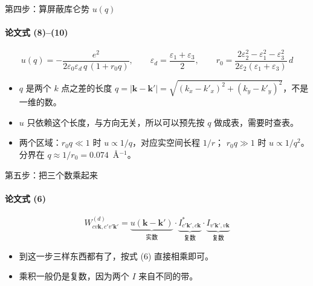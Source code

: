 \documentclass[aspectratio=169,11pt]{ctexbeamer}
\newcommand{\eps}{\varepsilon}
\newcommand{\kk}{\mathbf{k}}
\newcommand{\kq}{\mathbf{k}'}
\begin{document}
\begin{frame}{第四步：算屏蔽库仑势 $u(q)$}
  \framesubtitle{论文式 (8)--(10)}
  \begin{equation*}
    u(q)=-\frac{e^2}{2\eps_0\eps_d\,q\,(1+r_0q)},
    \qquad
    \eps_d=\frac{\eps_1+\eps_3}{2},
    \qquad
    r_0=\frac{2\eps_2^2-\eps_1^2-\eps_3^2}{2\eps_2(\eps_1+\eps_3)}\,d
  \end{equation*}
  \begin{itemize}
    \item $q$ 是两个 $k$ 点之差的长度
          $q=|\kk-\kq|=\sqrt{(k_x-k'_x)^2+(k_y-k'_y)^2}$，不是一维的数。
    \item $u$ 只依赖这个长度，与方向无关，所以可以预先按 $q$ 做成表，需要时查表。
    \item 两个区域：$r_0q\ll1$ 时 $u\propto1/q$，对应实空间长程 $1/r$；
          $r_0q\gg1$ 时 $u\propto1/q^2$。分界在 $q\approx1/r_0=0.074$~\AA$^{-1}$。
  \end{itemize}
\end{frame}


\begin{frame}{第五步：把三个数乘起来}
  \framesubtitle{论文式 (6)}
  \begin{equation*}
    W^{(d)}_{cv\kk,c'v'\kq}
    =\underbrace{u(\kk-\kq)}_{\text{实数}}\cdot
    \underbrace{I^{*}_{c'\kq,c\kk}}_{\text{复数}}\cdot
    \underbrace{I_{v'\kq,v\kk}}_{\text{复数}}
  \end{equation*}
  \begin{itemize}
    \item 到这一步三样东西都有了，按式 (6) 直接相乘即可。
    \item 乘积一般仍是复数，因为两个 $I$ 来自不同的带。
  \end{itemize}
\end{frame}
\end{document}
